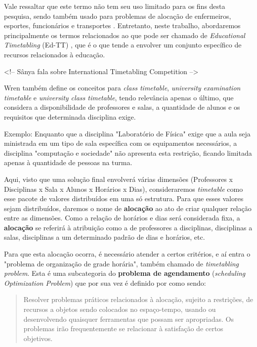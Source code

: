     Vale ressaltar que este termo não tem seu uso limitado para os fins desta pesquisa, sendo também usado para problemas de alocação de enfermeiros, esportes, funcionários e transportes \cite{arratia-martinez_university_2021}. Entretanto, neste trabalho, abordaremos principalmente os termos relacionados ao que pode ser chamado de \textit{Educational Timetabling} (Ed-TT) \cite{alencar_visualization_2019}, que é o que tende a envolver um conjunto específico de recursos relacionados à educação.

    <!-- Sânya fala sobre International Timetabling Competition -->

    Wren também define os conceitos para \textit{class timetable}, \textit{university examination timetable} e \textit{university class timetable}, tendo relevância apenas o último, que considera a disponibilidade de professores e salas, a quantidade de alunos e os requisitos que determinada disciplina exige.

    Exemplo: Enquanto que a disciplina "Laboratório de Física" exige que a aula seja ministrada em um tipo de sala específica com os equipamentos necessários, a disciplina "computação e sociedade" não apresenta esta restrição, ficando limitada apenas à quantidade de pessoas na turma.

    Aqui, visto que uma solução final envolverá várias dimensões (Professores x Disciplinas x Sala x Alunos x Horários x Dias), consideraremos \textit{timetable} como esse pacote de valores distribuídos em uma só estrutura. Para que esses valores sejam distribuídos, daremos o nome de \textbf{alocação} ao ato de criar qualquer relação entre as dimensões. Como a relação de horários e dias será considerada fixa, a \textbf{alocação} se referirá à atribuição como a de professores a disciplinas, disciplinas a salas, disciplinas a um determinado padrão de dias e horários, etc.

    Para que esta alocação ocorra, é necessário atender a certos critérios, e aí entra o "problema de organização de grade horária", também chamado de \textit{timetabling problem}. Esta é uma subcategoria do \textbf{problema de agendamento} (\textit{scheduling Optimization Problem}) \cite{alencar_visualization_2019} que por sua vez é definido por \cite{goos_scheduling_1996} como sendo:

    \begin{quote}\footnotesize
        Resolver problemas práticos relacionados à alocação, sujeito a restrições, de recursos a objetos sendo colocados no espaço-tempo, usando ou desenvolvendo quaisquer ferramentas que possam ser apropriadas. Os problemas irão frequentemente se relacionar à satisfação de certos objetivos.
    \end{quote}

